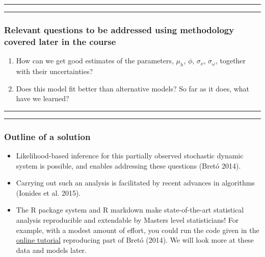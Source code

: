 \documentclass[]{article}
\begin{document}
\begin{center}\rule{0.5\linewidth}{\linethickness}\end{center}

\begin{center}\rule{0.5\linewidth}{\linethickness}\end{center}

\subsubsection{Relevant questions to be addressed using methodology
covered later in the
course}\label{relevant-questions-to-be-addressed-using-methodology-covered-later-in-the-course}

\begin{enumerate}
\def\labelenumi{\arabic{enumi}.}
\item
  How can we get good estimates of the parameters, \(\mu_h\), \(\phi\),
  \(\sigma_\nu\), \(\sigma_\omega\), together with their uncertainties?
\item
  Does this model fit better than alternative models? So far as it does,
  what have we learned?
\end{enumerate}

\begin{center}\rule{0.5\linewidth}{\linethickness}\end{center}

\begin{center}\rule{0.5\linewidth}{\linethickness}\end{center}

\subsubsection{Outline of a solution}\label{outline-of-a-solution}

\begin{itemize}
\item
  Likelihood-based inference for this partially observed stochastic
  dynamic system is possible, and enables addressing these questions
  (Bretó 2014).
\item
  Carrying out such an analysis is facilitated by recent advances in
  algorithms (Ionides et al. 2015).
\item
  The R package system and R markdown make state-of-the-art statistical
  analysis reproducible and extendable by Masters level statisticians!
  For example, with a modest amount of effort, you could run the code
  given in the
  \href{http://dept.stat.lsa.umich.edu/~ionides/tutorials/sp500/sp500.html}{online
  tutorial} reproducing part of Bretó (2014). We will look more at these
  data and models later.
\end{itemize}
\end{document}
